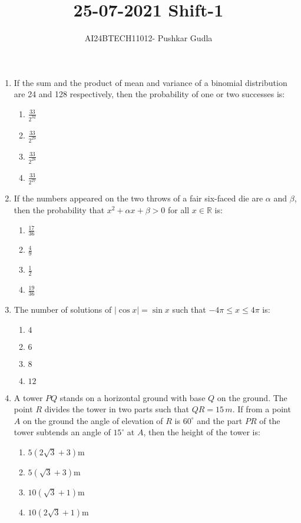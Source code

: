 \documentclass[journal,12pt,onecolumn]{IEEEtran}
\theoremstyle{remark}
\begin{document}

\vspace{3cm}

\title{\textbf{25-07-2021 Shift-1}}
\author{AI24BTECH11012- Pushkar Gudla}
\maketitle
\bigskip

\renewcommand{\thefigure}{\theenumi}
\renewcommand{\thetable}{\theenumi}
\setlength{\columnsep}{2.5em}


\begin{enumerate}
    \item If the sum and the product of mean and variance of a binomial distribution are 24 and 128 respectively, then the probability of one or two successes is:
    \begin{enumerate}
        \item $\frac{33}{2^{32}}$
        \item $\frac{33}{2^{29}}$
        \item $\frac{33}{2^{28}}$
        \item $\frac{33}{2^{27}}$
    \end{enumerate}
    
    \item If the numbers appeared on the two throws of a fair six-faced die are $\alpha$ and $\beta$, then the probability that $x^2 + \alpha x + \beta > 0$ for all $x \in \mathbb{R}$ is:
    \begin{enumerate}
        \item $\frac{17}{36}$
        \item $\frac{4}{9}$
        \item $\frac{1}{2}$
        \item $\frac{19}{36}$
    \end{enumerate}

    \item The number of solutions of $|\cos x| = \sin x$ such that $-4\pi \leq x \leq 4\pi$ is:
    \begin{enumerate}
        \item $4$
        \item $6$
        \item $8$
        \item $12$
    \end{enumerate}

    \item A tower $PQ$ stands on a horizontal ground with base $Q$ on the ground. The point $R$ divides the tower in two parts such that $QR = 15 \, m$. If from a point $A$ on the ground the angle of elevation of $R$ is $60^\circ$ and the part $PR$ of the tower subtends an angle of $15^\circ$ at $A$, then the height of the tower is:
    \begin{enumerate}
        \item $5(2\sqrt{3} + 3)$m
        \item $5(\sqrt{3} + 3)$m
        \item $10(\sqrt{3} + 1)$m
        \item $10(2\sqrt{3} + 1)$m
    \end{enumerate}


\end{enumerate}
\end{document}
